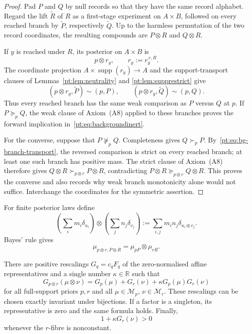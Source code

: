 \begin{proof}
Pad $P$ and $Q$ by null records so that they have the same record alphabet.
Regard the lift $\widetilde R$ of $R$ as a first-stage experiment on
$A\times B$, followed on every reached branch by $\widetilde P$, respectively
$\widetilde Q$.  Up to the harmless permutation of the two record
coordinates, the resulting compounds are $P\otimes R$ and $Q\otimes R$.

If $y$ is reached under $R$, its posterior on $A\times B$ is
\[
 p\otimes r_y,
 \qquad r_y:=r_y^{\,r,R}.
\]
The coordinate projection $A\times\operatorname{supp}(r_y)\to A$ and the
support-transport clauses of Lemmas~\ref{pt:lem:neutrality} and
\ref{pt:lem:supprestrict} give
\[
 (p\otimes r_y,\widetilde P)\sim(p,P),
 \qquad
 (p\otimes r_y,\widetilde Q)\sim(p,Q).
\tag{BI$'$}\label{pt:eq:bg-branch-transport}
\]
Thus every reached branch has the same weak comparison as $P$ versus $Q$ at
$p$.  If $P\succeq_pQ$, the weak clause of Axiom~\textup{(A8)} applied to
these branches proves the forward implication in~\eqref{pt:eq:backgroundinert}.

For the converse, suppose that $P\not\succeq_pQ$.  Completeness gives
$Q\succ_pP$.  By~\eqref{pt:eq:bg-branch-transport}, the reversed comparison is
strict on every reached branch; at least one such branch has positive mass.
The strict clause of Axiom~\textup{(A8)} therefore gives
$Q\otimes R\succ_{p\otimes r}P\otimes R$, contradicting
$P\otimes R\succeq_{p\otimes r}Q\otimes R$.  This proves the converse and
also records why weak branch monotonicity alone would not suffice.  Interchange
the coordinates for the symmetric assertion.
\end{proof}

For finite posterior laws define
\[
 \left(\sum_i m_i\delta_{u_i}\right)\otimes
 \left(\sum_j n_j\delta_{v_j}\right)
 :=\sum_{i,j}m_i n_j\delta_{u_i\otimes v_j}.
\]
Bayes' rule gives
\begin{equation}
 \mu_{p\otimes r,P\otimes R}=\mu_{pP}\otimes\mu_{rR}.
\tag{PL}\label{pt:eq:productlaw}
\end{equation}

\begin{lemma}
\label{pt:lem:coherentnorm}
There are positive rescalings $G_q=c_qF_q$ of the zero-normalised affine
representatives and a single number $\kappa\in\mathbb R$ such that
\begin{equation}
 G_{p\otimes r}(\mu\otimes\nu)
 =G_p(\mu)+G_r(\nu)+\kappa G_p(\mu)G_r(\nu)
\tag{QA}\label{pt:eq:QA}
\end{equation}
for all full-support priors $p,r$ and all
$\mu\in\mathcal M_p$, $\nu\in\mathcal M_r$.  These rescalings can be chosen
exactly invariant under bijections.  If a factor is a singleton, its
representative is zero and the same formula holds.  Finally,
\begin{equation}
 1+\kappa G_r(\nu)>0
\tag{POS}\label{pt:eq:QAslope}
\end{equation}
whenever the $r$-fibre is nonconstant.
\end{lemma}


